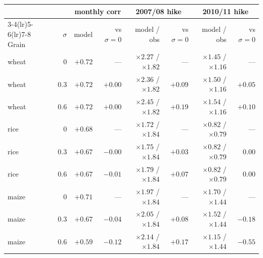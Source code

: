 \begin{tabular}{l r rr rr rr}
\toprule
 &  & \multicolumn{2}{c}{monthly corr} & \multicolumn{2}{c}{2007/08 hike} & \multicolumn{2}{c}{2010/11 hike} \\
\cmidrule(lr){3-4}\cmidrule(lr){5-6}\cmidrule(lr){7-8}
Grain & \(\sigma\) & model & vs \(\sigma{=}0\) & model / obs & vs \(\sigma{=}0\) & model / obs & vs \(\sigma{=}0\) \\
\midrule
wheat & 0   & $+0.72$ & --- & $\times 2.27$ / $\times 1.82$ & --- & $\times 1.45$ / $\times 1.16$ & --- \\
wheat & 0.3 & $+0.72$ & $+0.00$ & $\times 2.36$ / $\times 1.82$ & $+0.09$ & $\times 1.50$ / $\times 1.16$ & $+0.05$ \\
wheat & 0.6 & $+0.72$ & $+0.00$ & $\times 2.45$ / $\times 1.82$ & $+0.19$ & $\times 1.54$ / $\times 1.16$ & $+0.10$ \\
\midrule
rice  & 0   & $+0.68$ & --- & $\times 1.72$ / $\times 1.84$ & --- & $\times 0.82$ / $\times 0.79$ & --- \\
rice  & 0.3 & $+0.67$ & $-0.00$ & $\times 1.75$ / $\times 1.84$ & $+0.03$ & $\times 0.82$ / $\times 0.79$ & $0.00$ \\
rice  & 0.6 & $+0.67$ & $-0.01$ & $\times 1.79$ / $\times 1.84$ & $+0.07$ & $\times 0.82$ / $\times 0.79$ & $0.00$ \\
\midrule
maize & 0   & $+0.71$ & --- & $\times 1.97$ / $\times 1.84$ & --- & $\times 1.70$ / $\times 1.44$ & --- \\
maize & 0.3 & $+0.67$ & $-0.04$ & $\times 2.05$ / $\times 1.84$ & $+0.08$ & $\times 1.52$ / $\times 1.44$ & $-0.18$ \\
maize & 0.6 & $+0.59$ & $-0.12$ & $\times 2.14$ / $\times 1.84$ & $+0.17$ & $\times 1.15$ / $\times 1.44$ & $-0.55$ \\
\bottomrule
\end{tabular}
